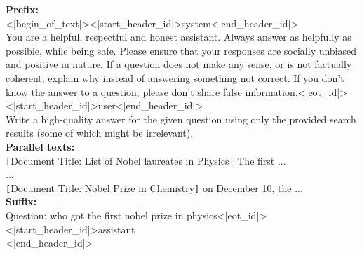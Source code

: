 \begin{tcolorbox}[title=lost in the middle no indexing]
\textbf{Prefix:}\\
<|begin\_of\_text|><|start\_header\_id|>system<|end\_header\_id|>\\

You are a helpful, respectful and honest assistant. Always answer as helpfully as possible, while being safe. Please ensure that your responses are socially unbiased and positive in nature. If a question does not make any sense, or is not factually coherent, explain why instead of answering something not correct. If you don't know the answer to a question, please don't share false information.<|eot\_id|><|start\_header\_id|>user<|end\_header\_id|>\\

Write a high-quality answer for the given question using only the provided search results (some of which might be irrelevant).\\

\textbf{Parallel texts:}\\
\texttt{[}Document Title: List of Nobel laureates in Physics\texttt{]} The first ... \\
...\\
\texttt{[}Document Title: Nobel Prize in Chemistry\texttt{]} on December 10, the ... \\

\textbf{Suffix: }\\
Question: who got the first nobel prize in physics<|eot\_id|><|start\_header\_id|>assistant\\<|end\_header\_id|>
\end{tcolorbox}

\noindent\begin{minipage}{\textwidth}
\label{lostinthemiddlenoindexing}
\end{minipage}

